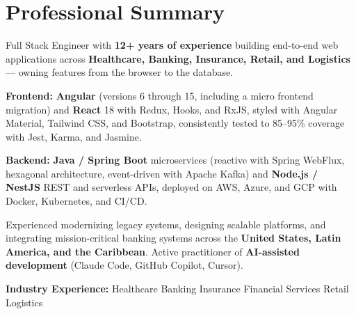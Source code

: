 
\section{Professional Summary}

{\small
Full Stack Engineer with \textbf{12+ years of experience} building end-to-end web applications
across \textbf{Healthcare, Banking, Insurance, Retail, and Logistics} --- owning features from the
browser to the database.

\vspace{4pt}
\textbf{Frontend:} \textbf{Angular} (versions 6 through 15, including a micro frontend migration)
and \textbf{React} 18 with Redux, Hooks, and RxJS, styled with Angular Material, Tailwind CSS, and
Bootstrap, consistently tested to 85--95\% coverage with Jest, Karma, and Jasmine.

\vspace{4pt}
\textbf{Backend:} \textbf{Java / Spring Boot} microservices (reactive with Spring WebFlux,
hexagonal architecture, event-driven with Apache Kafka) and \textbf{Node.js / NestJS} REST and
serverless APIs, deployed on AWS, Azure, and GCP with Docker, Kubernetes, and CI/CD.

\vspace{4pt}
Experienced modernizing legacy systems, designing scalable platforms, and integrating
mission-critical banking systems across the \textbf{United States, Latin America, and the
Caribbean}. Active practitioner of \textbf{AI-assisted development} (Claude Code, GitHub Copilot,
Cursor).
}

\vspace{4pt}
{\small\color{cvMuted}%
  \textbf{Industry Experience:}\enspace%
  Healthcare\enspace\textbar\enspace
  Banking\enspace\textbar\enspace
  Insurance\enspace\textbar\enspace
  Financial Services\enspace\textbar\enspace
  Retail\enspace\textbar\enspace
  Logistics%
}
